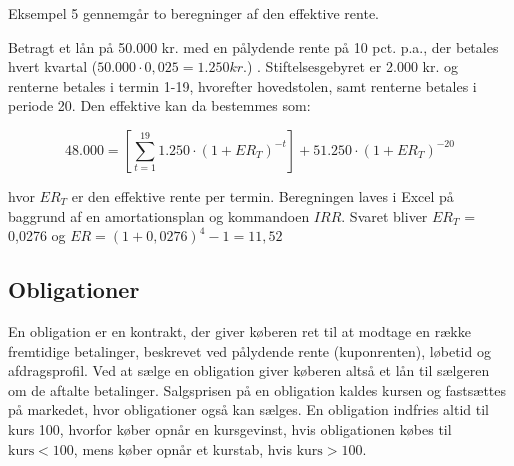 \documentclass[10pt,reqno, usenames]{article}
\begin{document}
Eksempel 5 gennemgår to beregninger af den effektive rente. 

\begin{tcolorbox}[breakable, colback=red!5!white, colframe=red!50!black, title= Eksempel 5: Beregning af effektiv rente]
Betragt et lån på 50.000 kr. med en pålydende rente på 10 pct. p.a., der betales hvert kvartal ($50.000 \cdot 0,025 =1.250 kr.$) . Stiftelsesgebyret er 2.000 kr. og renterne betales i termin 1-19, hvorefter hovedstolen, samt renterne betales i periode 20. Den effektive kan da bestemmes som:  

\begin{equation*}
    48{.}000 = \left[ \sum_{t=1}^{19} 1{.}250 \cdot (1 + ER_T)^{-t} \right] + 51{.}250 \cdot (1 + ER_T)^{-20}
\end{equation*}

hvor $ER_T$ er den effektive rente per termin. Beregningen laves i Excel på baggrund af en amortationsplan og kommandoen $IRR$. Svaret bliver $ER_T$ = 0,0276 og $ER = (1+0,0276)^4 - 1 = 11,52$
\end{tcolorbox}

\subsection{Obligationer}
En obligation er en kontrakt, der giver køberen ret til at modtage en række fremtidige betalinger, beskrevet ved pålydende rente (kuponrenten), løbetid og afdragsprofil. Ved at sælge en obligation giver køberen altså et lån til sælgeren om de aftalte betalinger. Salgsprisen på en obligation kaldes kursen og fastsættes på markedet, hvor obligationer også kan sælges. En obligation indfries altid til kurs 100, hvorfor køber opnår en kursgevinst, hvis obligationen købes til $\text{kurs}<100$, mens køber opnår et kurstab, hvis $\text{kurs}>100$. 

\vspace{10 pt}
\end{document}
